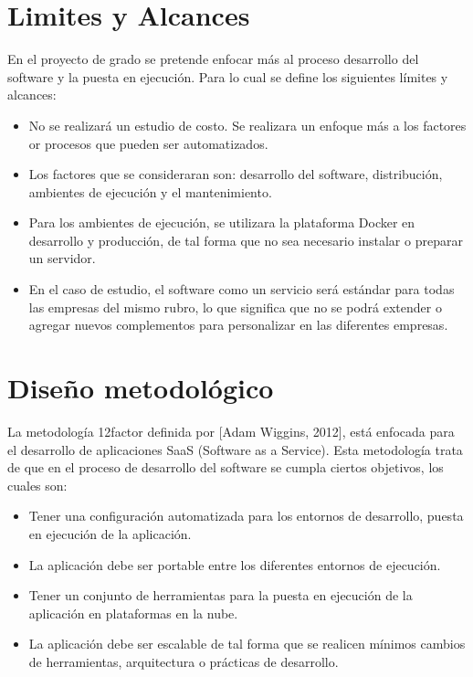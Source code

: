 \section{Limites y Alcances}
\noindent En el proyecto de grado se pretende enfocar más al proceso desarrollo del software y la puesta en ejecución. Para lo cual se define los siguientes límites y alcances:
\begin{itemize}
  \item No se realizará un estudio de costo. Se realizara un enfoque más a los factores or procesos que pueden ser automatizados.
  \item Los factores que se consideraran son: desarrollo del software, distribución, ambientes de ejecución y el mantenimiento.
  \item Para los ambientes de ejecución, se utilizara la plataforma Docker en desarrollo y producción, de tal forma que no sea necesario instalar o preparar un servidor.
  \item En el caso de estudio, el software como un servicio será estándar para todas las empresas del mismo rubro, lo que significa que no se podrá extender o agregar nuevos complementos para personalizar en las diferentes empresas.
\end{itemize}

\section{Diseño metodológico}
\noindent La metodología 12factor definida por [Adam Wiggins, 2012], está enfocada para el desarrollo de aplicaciones SaaS (Software as a Service). Esta metodología trata de que en el proceso de desarrollo del software se cumpla ciertos objetivos, los cuales son:

\begin{itemize}
  \item Tener una configuración automatizada para los entornos de desarrollo, puesta en ejecución de la aplicación.
  \item La aplicación debe ser portable entre los diferentes entornos de ejecución.
  \item Tener un conjunto de herramientas para la puesta en ejecución de la aplicación en plataformas en la nube.
  \item La aplicación debe ser escalable de tal forma que se realicen mínimos cambios de herramientas, arquitectura o prácticas de desarrollo.
\end{itemize}

